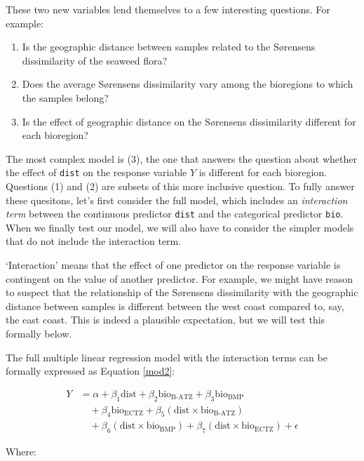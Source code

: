 \documentclass[
  letterpaper,
]{book}
\providecommand{\tightlist}{%
  \setlength{\itemsep}{0pt}\setlength{\parskip}{0pt}}\usepackage{longtable,booktabs,array}
\begin{document}
These two new variables lend themselves to a few interesting questions.
For example:

\begin{enumerate}
\def\labelenumi{\arabic{enumi}.}
\tightlist
\item
  Is the geographic distance between samples related to the Sørensens
  dissimilarity of the seaweed flora?
\item
  Does the average Sørensens dissimilarity vary among the bioregions to
  which the samples belong?
\item
  Is the effect of geographic distance on the Sørensens dissimilarity
  different for each bioregion?
\end{enumerate}

The most complex model is (3), the one that answers the question about
whether the effect of \texttt{dist} on the response variable \(Y\) is
different for each bioregion. Questions (1) and (2) are subsets of this
more inclusive question. To fully answer these quesitons, let's first
consider the full model, which includes an \emph{interaction term}
between the continuous predictor \texttt{dist} and the categorical
predictor \texttt{bio}. When we finally test our model, we will also
have to consider the simpler models that do not include the interaction
term.

`Interaction' means that the effect of one predictor on the response
variable is contingent on the value of another predictor. For example,
we might have reason to suspect that the relationship of the Sørensens
dissimilarity with the geographic distance between samples is different
between the west coast compared to, say, the east coast. This is indeed
a plausible expectation, but we will test this formally below.

The full multiple linear regression model with the interaction terms can
be formally expressed as Equation \ref{mod2}:

\begin{align}
Y &= \alpha + \beta_1 \text{dist} + \beta_2 \text{bio}_{\text{B-ATZ}} + \beta_3 \text{bio}_{\text{BMP}} \nonumber \\
  &\quad + \beta_4 \text{bio}_{\text{ECTZ}} + \beta_5 (\text{dist} \times \text{bio}_{\text{B-ATZ}}) \nonumber \\
  &\quad + \beta_6 (\text{dist} \times \text{bio}_{\text{BMP}}) + \beta_7 (\text{dist} \times \text{bio}_{\text{ECTZ}}) + \epsilon \label{mod2}
\end{align}

Where:
\end{document}
